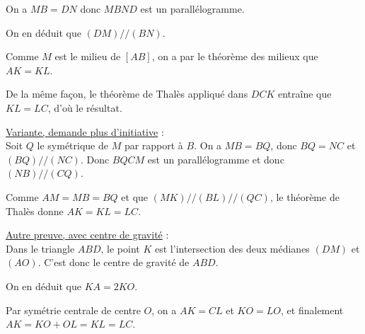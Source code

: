 \begin{Soln}{96}
 On a $MB=DN$ donc $MBND$ est un parallélogramme.

 On en déduit que $(DM)//(BN)$.

 Comme $M$ est le milieu de $[AB]$, on a par le théorème des milieux que $AK=KL$.

 De la même façon, le théorème de Thalès appliqué dans $DCK$ entraîne que $KL=LC$, d'où le résultat.

\underline{Variante, demande plus d'initiative} :\\
Soit $Q$ le symétrique de $M$ par rapport à $B$. On a $MB=BQ$, donc $BQ=NC$ et $(BQ)//(NC)$. Donc $BQCM$ est un parallélogramme et donc $(NB)//(CQ)$.

Comme $AM=MB=BQ$ et que $(MK)//(BL)//(QC)$, le théorème de Thalès donne $AK=KL=LC$.

\underline{Autre preuve, avec centre de gravité} :\\
Dans le triangle $ABD$, le point $K$ est l'intersection des deux médianes $(DM)$ et $(AO)$. C'est donc le centre de gravité de $ABD$.

On en déduit que $KA = 2KO$.

Par symétrie centrale de centre $O$, on a $AK=CL$ et $KO=LO$, et finalement $AK = KO+OL = KL = LC$.
\end{Soln}
